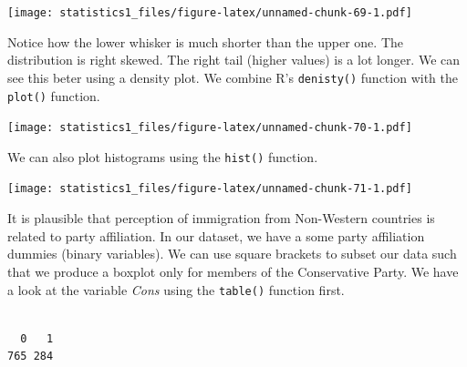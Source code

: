 \documentclass[]{book}
\newenvironment{Shaded}{\begin{snugshade}}{\end{snugshade}}
\newcommand{\KeywordTok}[1]{\textcolor[rgb]{0.13,0.29,0.53}{\textbf{#1}}}
\newcommand{\DataTypeTok}[1]{\textcolor[rgb]{0.13,0.29,0.53}{#1}}
\newcommand{\StringTok}[1]{\textcolor[rgb]{0.31,0.60,0.02}{#1}}
\newcommand{\CommentTok}[1]{\textcolor[rgb]{0.56,0.35,0.01}{\textit{#1}}}
\newcommand{\OperatorTok}[1]{\textcolor[rgb]{0.81,0.36,0.00}{\textbf{#1}}}
\newcommand{\NormalTok}[1]{#1}
\theoremstyle{definition}
\theoremstyle{definition}
\theoremstyle{definition}
\theoremstyle{remark}
\begin{document}
\texttt{[image: statistics1\_files/figure-latex/unnamed-chunk-69-1.pdf]}

Notice how the lower whisker is much shorter than the upper one. The
distribution is right skewed. The right tail (higher values) is a lot
longer. We can see this beter using a density plot. We combine R's
\texttt{denisty()} function with the \texttt{plot()} function.

\begin{Shaded}
\end{Shaded}

\texttt{[image: statistics1\_files/figure-latex/unnamed-chunk-70-1.pdf]}

We can also plot histograms using the \texttt{hist()} function.

\begin{Shaded}
\end{Shaded}

\texttt{[image: statistics1\_files/figure-latex/unnamed-chunk-71-1.pdf]}

It is plausible that perception of immigration from Non-Western
countries is related to party affiliation. In our dataset, we have a
some party affiliation dummies (binary variables). We can use square
brackets to subset our data such that we produce a boxplot only for
members of the Conservative Party. We have a look at the variable
\emph{Cons} using the \texttt{table()} function first.

\begin{Shaded}
\end{Shaded}

\begin{verbatim}

  0   1 
765 284 
\end{verbatim}
\end{document}
